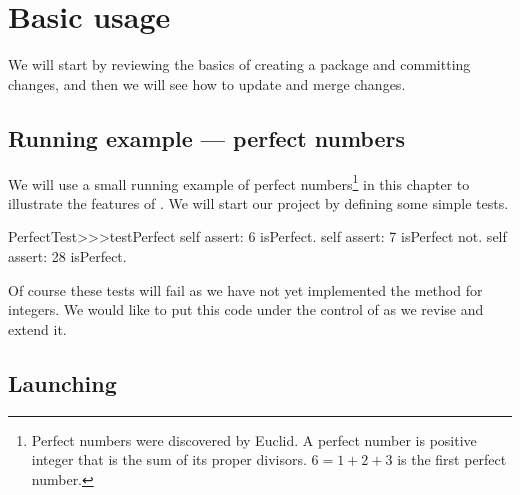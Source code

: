 \documentclass[a4paper,10pt,twoside]{book}
\begin{document}

\section{Basic usage}

We will start by reviewing the basics of creating a package and committing changes, and then we will see how to update and merge changes. 

\subsection{Running example --- perfect numbers}

We will use a small running example of perfect numbers\footnote{Perfect numbers were discovered by Euclid. A perfect number is positive integer that is the sum of its proper divisors. $6 = 1 + 2 + 3$ is the first perfect number.} in this chapter to illustrate the features of \MC. We will start our project by defining some simple tests.

\begin{code}{}
PerfectTest>>>testPerfect
	self assert: 6 isPerfect.
	self assert: 7 isPerfect not.
	self assert: 28 isPerfect.
\end{code}

Of course these tests will fail as we have not yet implemented the  method for integers. We would like to put this code under the control of \MC as we revise and extend it.

\subsection{Launching \MC}
\end{document}
